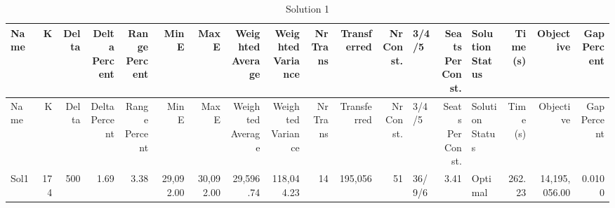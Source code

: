 \documentclass[a4paper]{article}
\begin{document}
{\scriptsize
\begin{longtable}{lrrrrrrrrrrrlrlrrr}
\caption{Solution 1}
\\ \toprule
Name &K &Delta &\shortstack{Delta\\Percent} &\shortstack{Range\\Percent} &Min E &Max E &\shortstack{Weighted\\Average} &\shortstack{Weighted\\Variance} &\shortstack{Nr\\Trans} &Transferred &\shortstack{Nr\\Const.} &3/4/5 &\shortstack{Seats\\Per\\Const.} &\shortstack{Solution\\Status} &\shortstack{Time\\(s)} &Objective &\shortstack{Gap\\Percent} \\ \midrule
\endfirsthead
\toprule
Name &K &Delta &\shortstack{Delta\\Percent} &\shortstack{Range\\Percent} &Min E &Max E &\shortstack{Weighted\\Average} &\shortstack{Weighted\\Variance} &\shortstack{Nr\\Trans} &Transferred &\shortstack{Nr\\Const.} &3/4/5 &\shortstack{Seats\\Per\\Const.} &\shortstack{Solution\\Status} &\shortstack{Time\\(s)} &Objective &\shortstack{Gap\\Percent} \\ \midrule
\endhead
\bottomrule
\endfoot
Sol1&174&500& 1.69& 3.38&29,092.00&30,092.00&29,596.74&118,044.23&14&195,056&51&36/9/6& 3.41&Optimal&262.23&14,195,056.00&0.0100\\ 
\end{longtable}

}
\end{document}
